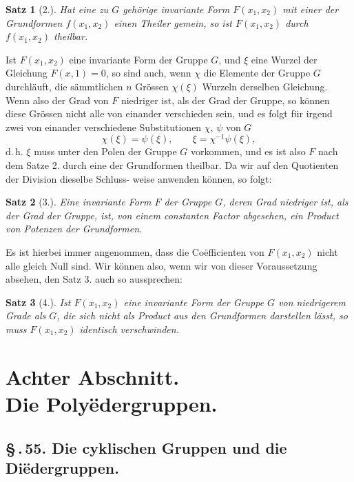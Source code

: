 \documentclass[12pt,a4paper]{article}
\theoremstyle{plain}
\newtheorem{satz}{Satz}[section]
\theoremstyle{definition}
\theoremstyle{remark}
\newcommand{\sect}[1]{\S\,.\,#1.}
\begin{document}
\begin{satz}[2.]
Hat eine zu $G$ geh\"orige invariante Form $F(x_1, x_2)$
mit einer der Grundformen $f(x_1, x_2)$ einen Theiler
gemein, so ist $F(x_1, x_2)$ durch $f(x_1, x_2)$ theilbar.
\end{satz}

Ist $F(x_1, x_2)$ eine invariante Form der Gruppe $G$, und $\xi$
eine Wurzel der Gleichung $F(x, 1) = 0$, so sind auch, wenn
$\chi$ die Elemente der Gruppe $G$ durchl\"auft, die s\"ammtlichen
$n$ Gr\"ossen $\chi(\xi)$ Wurzeln derselben Gleichung. Wenn also der
Grad von $F$ niedriger ist, als der Grad der Gruppe, so k\"onnen
diese Gr\"ossen nicht alle von einander verschieden sein, und es
folgt f\"ur irgend zwei von einander verschiedene Substitutionen
$\chi$, $\psi$ von $G$
\[
\chi(\xi) = \psi(\xi),\qquad \xi = \chi^{-1}\psi(\xi),
\]
d.\,h. $\xi$ muss unter den Polen der Gruppe $G$ vorkommen, und
es ist also $F$ nach dem Satze 2. durch eine der Grundformen
theilbar. Da wir auf den Quotienten der Division dieselbe Schluss-
weise anwenden k\"onnen, so folgt:

\begin{satz}[3.]
Eine invariante Form $F$ der Gruppe $G$, deren
Grad niedriger ist, als der Grad der Gruppe,
ist, von einem constanten Factor abgesehen, ein
Product von Potenzen der Grundformen.
\end{satz}

Es ist hierbei immer angenommen, dass die Co\"efficienten
von $F(x_1, x_2)$ nicht alle gleich Null sind. Wir k\"onnen also,
wenn wir von dieser Voraussetzung absehen, den Satz 3. auch
so aussprechen:

\begin{satz}[4.]
Ist $F(x_1, x_2)$ eine invariante Form der Gruppe $G$
von niedrigerem Grade als $G$, die sich nicht als
Product aus den Grundformen darstellen l\"asst,
so muss $F(x_1, x_2)$ identisch verschwinden.
\end{satz}


\section*{Achter Abschnitt.\\[-0.3em] Die Poly\"edergruppen.}

\subsection*{\sect{55} Die cyklischen Gruppen und die Di\"edergruppen.}
\end{document}
